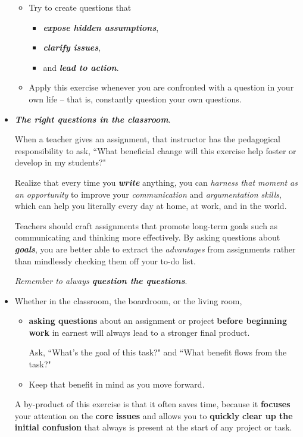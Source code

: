 \documentclass[11pt]{article}
\begin{document}
\begin{itemize}
\begin{exercise}
\begin{itemize}
\item Try to create questions that 
\begin{itemize}
\item \emph{\textbf{expose hidden assumptions}}, 
\item \emph{\textbf{clarify issues}}, 
\item and \emph{\textbf{lead to action}}.
\end{itemize}

\item Apply this exercise whenever you are confronted with a question in your own life -- that is, constantly question your own questions.
\end{itemize}
\end{exercise}


\item \emph{\textbf{The right questions in the classroom}}. 

When a teacher gives an assignment, that instructor has the pedagogical responsibility to ask, ``What beneficial change will this exercise help foster or develop in my students?"

Realize that every time you \emph{\textbf{write}} anything, you can \emph{harness that moment as an opportunity} to improve your \emph{communication} and \emph{argumentation skills}, which can help you literally every day at home, at work, and in the world. 

Teachers should craft assignments that promote long-term goals such as communicating and thinking more effectively. By asking questions about \emph{\textbf{goals}}, you are better able to extract the \emph{advantages} from assignments rather than mindlessly checking them off your to-do list. 

\emph{Remember to always \textbf{question the questions}}.

\item \begin{exercise}
Whether in the classroom, the boardroom, or the living room, 
\begin{itemize}
\item \textbf{asking questions} about an assignment or project \textbf{before beginning work} in earnest will always lead to a stronger final product.  

Ask, ``What’s the goal of this task?" and ``What benefit flows from the task?" 

\item Keep that benefit in mind as you move forward. 
\end{itemize}
A by-product of this exercise is that it often saves time, because it \textbf{focuses} your attention on the \textbf{core issues} and allows you to \textbf{quickly} \textbf{clear up the initial confusion} that always is present at the start of any project or task.
\end{exercise}
\end{itemize}
\end{document}

